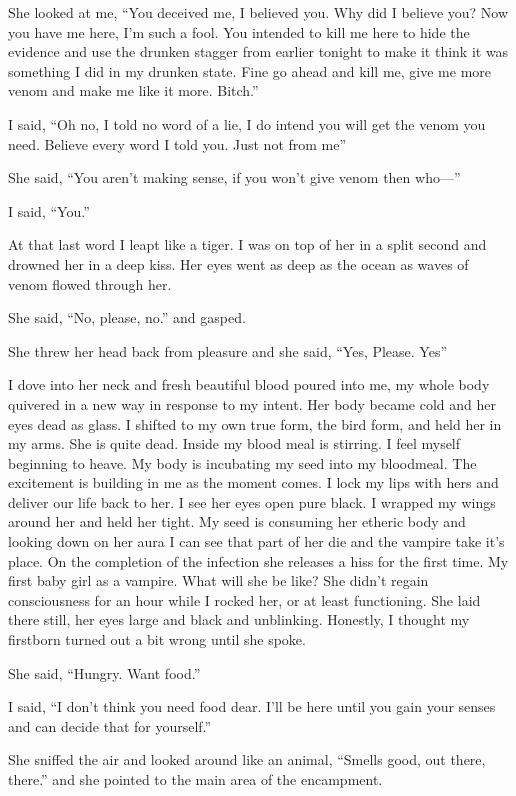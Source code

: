 She looked at me, ``You deceived me, I believed you. Why did I believe you? Now you have me here, I'm such a fool. You intended to kill me here to hide the evidence and use the drunken stagger from earlier tonight to make it think it was something I did in my drunken state. Fine go ahead and kill me, give me more venom and make me like it more. Bitch.''

I said, ``Oh no, I told no word of a lie, I do intend you will get the venom you need. Believe every word I told you. Just not from me''

She said, ``You aren't making sense, if you won't give venom then who---''

I said, ``You.''

At that last word I leapt like a tiger. I was on top of her in a split second and drowned her in a deep kiss. Her eyes went as deep as the ocean as waves of venom flowed through her. 

She said, ``No, please, no.'' and gasped. 

She threw her head back from pleasure and she said, ``Yes, Please. Yes''

I dove into her neck and fresh beautiful blood poured into me, my whole body quivered in a new way in response to my intent. Her body became cold and her eyes dead as glass. I shifted to my own true form, the bird form, and held her in my arms. She is quite dead. Inside my blood meal is stirring. I feel myself beginning to heave. My body is incubating my seed into my bloodmeal. The excitement is building in me as the moment comes. I lock my lips with hers and deliver our life back to her. I see her eyes open pure black. I wrapped my wings around her and held her tight. My seed is consuming her etheric body and looking down on her aura I can see that part of her die and the vampire take it's place. On the completion of the infection she releases a hiss for the first time. My first baby girl as a vampire. What will she be like? She didn't regain consciousness for an hour while I rocked her, or at least functioning. She laid there still, her eyes large and black and unblinking. Honestly, I thought my firstborn turned out a bit wrong until she spoke.

She said, ``Hungry. Want food.''

I said, ``I don't think you need food dear. I'll be here until you gain your senses and can decide that for yourself.''

She sniffed the air and looked around like an animal, ``Smells good, out there, there.'' and she pointed to the main area of the encampment.

